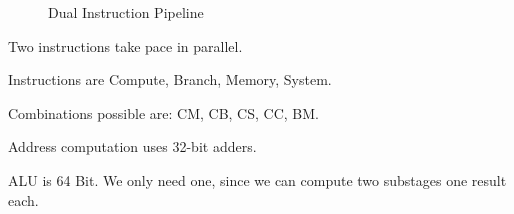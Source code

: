 \begin{figure}[H]
\begin{center}
\end{center}
\caption{Dual Instruction Pipeline}
\label{fig:DUal Instruction Pipeline}
\end{figure}

Two instructions take pace in parallel. 

Instructions are Compute, Branch, Memory, System.

Combinations possible are: CM, CB, CS, CC, BM.

Address computation uses 32-bit adders.

ALU is 64 Bit. We only need one, since we can compute two substages one result each.

 

